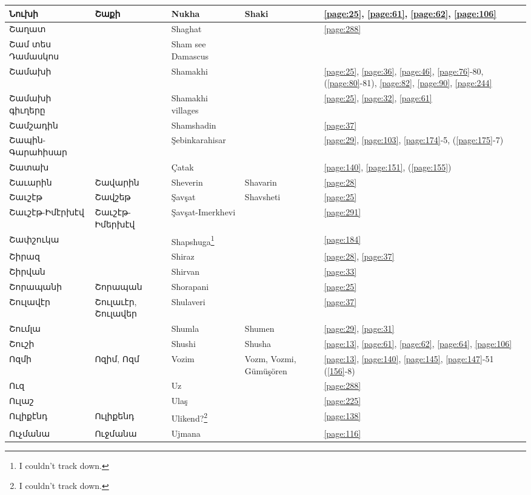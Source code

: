 \begin{center}
\begin{longtable}{|p{}|p{3cm}|p{3cm}|p{2cm}|p{3cm}|}
Նուխի&   Շաքի& Nukha  & Shaki&\ref{page:25}, \ref{page:61}, \ref{page:62}, \ref{page:106}\\ \hline
Շաղատ& &Shaghat & &\ref{page:288}\\ \hline
Շամ տես Դամասկոս& &Sham see Damascus & &\\ \hline
Շամախի& &Shamakhi & &\ref{page:25}, \ref{page:36}, \ref{page:46}, \ref{page:76}-80, (\ref{page:80}-81), \ref{page:82}, \ref{page:90}, \ref{page:244}\\ \hline
Շամախի գիւղերը& &Shamakhi villages & &\ref{page:25}, \ref{page:32}, \ref{page:61}\\ \hline
Շամշադին& &Shamshadin & &\ref{page:37}\\ \hline
Շապին-Գարահիսար& & Şebinkarahisar& &\ref{page:29}, \ref{page:103}, \ref{page:174}-5, (\ref{page:175}-7)\\ \hline
Շատախ& & Çatak& &\ref{page:140}, \ref{page:151}, (\ref{page:155})\\ \hline
Շաւարին& Շավարին&  Sheverin &Shavarin &\ref{page:28}\\ \hline
Շաւշէթ&Շավշեթ &Şavşat &Shavsheti &\ref{page:25}\\ \hline
Շաւշէթ-Իմէրխէվ&Շաւշէթ-Իմերխէվ & Şavşat-Imerkhevi& &\ref{page:291}\\ \hline
Շափշուկա& & Shapshuga\footnote{I couldn't track down.}& &\ref{page:184}\\ \hline
Շիրազ& &Shiraz & &\ref{page:28}, \ref{page:37}\\ \hline
Շիրվան& &Shirvan & &\ref{page:33}\\ \hline
Շորապանի&Շորապան & Shorapani& &\ref{page:25}\\ \hline
Շուլավէր&Շուլաւէր, Շուլավեր &Shulaveri & &   \ref{page:37}\\ \hline
Շումլա& &Shumla & Shumen& \ref{page:29}, \ref{page:31} \\ \hline
Շուշի& & Shushi&Shusha &\ref{page:13}, \ref{page:61}, \ref{page:62}, \ref{page:64}, \ref{page:106} \\\hline
Ոզմի& Ոզիմ, Ոզմ& Vozim&Vozm, Vozmi, Gümüşören & \ref{page:13}, \ref{page:140}, \ref{page:145}, \ref{page:147}-51 (\ref{156}-8) \\ \hline 
Ուզ & &Uz & &    \ref{page:288}\\ \hline
Ուլաշ& &Ulaş & &\ref{page:225}\\ \hline
Ուլիքէնդ&Ուլիքենդ & Ulikend?\footnote{I couldn't track down.}& &\ref{page:138}\\ \hline
Ուչմանա& Ուջմանա&Ujmana & &\ref{page:116}\\ \hline

\end{longtable}
\end{center}
